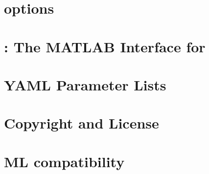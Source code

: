\documentclass[pdf,12pt,report]{SANDreport}
\begin{document}
    \chapter{\muelu{} options} \label{sec:options}
    

    \chapter{\muemex: The MATLAB Interface for \muelu} \label{sec:muemex}
    

    \chapter{YAML Parameter Lists}\label{sec:yaml}
    


    \clearpage
    \providecommand*{\phantomsection}{}
    \phantomsection
    
    


    \appendix
    \chapter{Copyright and License}
    

    \chapter{ML compatibility}
    



    
\end{document}
